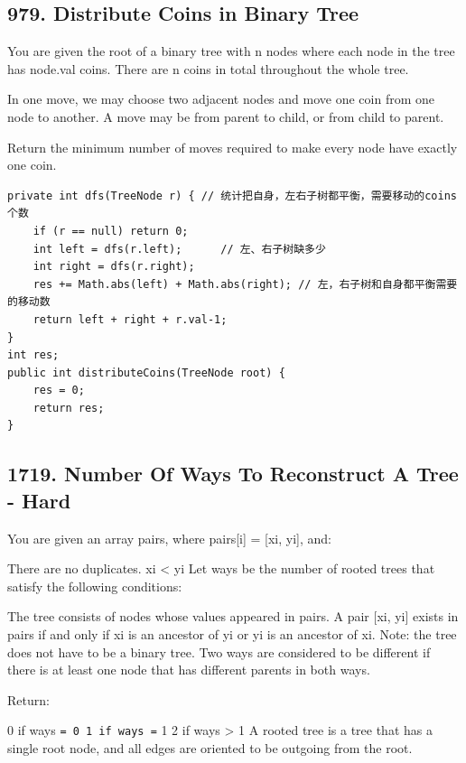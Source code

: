 \documentclass[9pt, b5paaper]{book}
\begin{document}
\subsection{979. Distribute Coins in Binary Tree}
\label{sec-3-0-1}
You are given the root of a binary tree with n nodes where each node in the tree has node.val coins. There are n coins in total throughout the whole tree.

In one move, we may choose two adjacent nodes and move one coin from one node to another. A move may be from parent to child, or from child to parent.

Return the minimum number of moves required to make every node have exactly one coin.
\begin{verbatim}
private int dfs(TreeNode r) { // 统计把自身，左右子树都平衡，需要移动的coins个数
    if (r == null) return 0;
    int left = dfs(r.left);      // 左、右子树缺多少
    int right = dfs(r.right);
    res += Math.abs(left) + Math.abs(right); // 左，右子树和自身都平衡需要的移动数
    return left + right + r.val-1;
}
int res;
public int distributeCoins(TreeNode root) {
    res = 0;
    return res;
}
\end{verbatim}

\subsection{1719. Number Of Ways To Reconstruct A Tree - Hard}
\label{sec-3-0-2}
You are given an array pairs, where pairs[i] = [xi, yi], and:

There are no duplicates.
xi < yi
Let ways be the number of rooted trees that satisfy the following conditions:

The tree consists of nodes whose values appeared in pairs.
A pair [xi, yi] exists in pairs if and only if xi is an ancestor of yi or yi is an ancestor of xi.
Note: the tree does not have to be a binary tree.
Two ways are considered to be different if there is at least one node that has different parents in both ways.

Return:

0 if ways \texttt{= 0
1 if ways =} 1
2 if ways > 1
A rooted tree is a tree that has a single root node, and all edges are oriented to be outgoing from the root.
\end{document}
